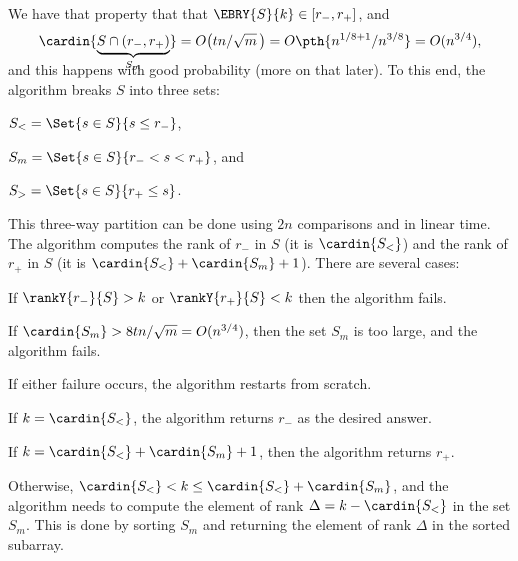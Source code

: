 We have that property that that
$\EBRY{S}{k} \in [r_{-}, r_{+}]$, and
\begin{equation*}
    \cardin{ \smash{\underbrace{S \cap (r_{-}, r_{+})}_{S_m}} }%
    =%
    O\bigl(tn /\sqrt{m}\,\bigr)%
    =%
    O\pth{ n^{1/8+ 1}  / n^{3/8}}%
    =%
    O(n^{3/4}),
\end{equation*} %
and this happens with good probability (more on that later).
To this end, the algorithm breaks $S$ into three sets:
\begin{compactenumi}
    \smallskip%
    \item $S_< = \Set{ s \in S}{s \leq r_{-}}$,
    \smallskip%
    \item $S_m = \Set{ s \in S}{r_{-} < s < r_{+}}$, and
    \smallskip%
    \item $S_> = \Set{ s \in S}{ r_{+} \leq s}$.
\end{compactenumi}%
\medskip%
This three-way partition can be done using $2n$ comparisons and in linear
time.  The algorithm computes the rank of $r_-$ in $S$ (it is
$\cardin{S_<}$) and the rank of $r_{+}$ in $S$ (it is
$\cardin{S_<} + \cardin{S_m} + 1$). There are several cases: \smallskip%
\begin{compactitem}
    \item If $\rankY{r_{-}}{ S} > k$ or $\rankY{r_{+}}{S} < k $ then the
    algorithm fails.

    \item If $\cardin{S_m} > 8 t {n}/ \sqrt{m} = O(n^{3/4})$, then the
    set $S_m$ is too large, and the algorithm fails.
\end{compactitem}
\medskip%
If either failure occurs, the algorithm restarts from scratch.
\begin{compactitem}
    \smallskip%
    \item If $k = \cardin{S_<}$, the algorithm returns $r_-$ as the
    desired answer.

    \smallskip%
    \item If $k = \cardin{S_<} + \cardin{S_m} + 1$, then the algorithm
    returns $r_+$.

    \smallskip%
    \item Otherwise, $\cardin{S_<} < k \leq \cardin{S_<} + \cardin{S_m}$,
    and the algorithm needs to compute the element of rank
    $\Delta = k - \cardin{S_<}$ in the set $S_m$. This is done by sorting
    $S_m$ and returning the element of rank $\Delta$ in the sorted
    subarray.
\end{compactitem}

